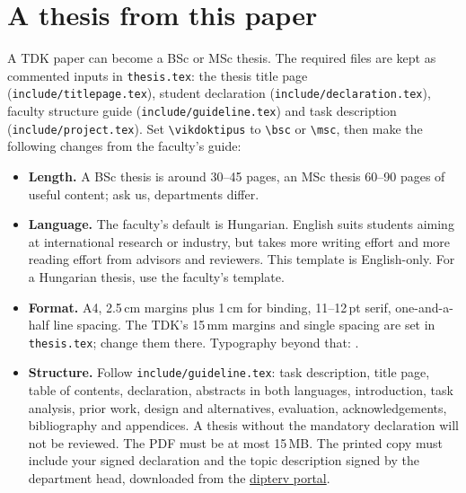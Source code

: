 \section{A thesis from this paper}\label{app:tdk:thesis}
A TDK paper can become a BSc or MSc thesis. The required files are kept as commented inputs in \texttt{thesis.tex}: the thesis title page (\texttt{include/titlepage.tex}), student declaration (\texttt{include/declaration.tex}), faculty structure guide (\texttt{include/guideline.tex}) and task description (\texttt{include/project.tex}). Set \texttt{\textbackslash vikdoktipus} to \texttt{\textbackslash bsc} or \texttt{\textbackslash msc}, then make the following changes from the faculty's guide:
\begin{itemize}[noitemsep]
  \item \textbf{Length.} A BSc thesis is around 30--45 pages, an MSc thesis 60--90 pages of useful content; ask us, departments differ.
  \item \textbf{Language.} The faculty's default is Hungarian. English suits students aiming at international research or industry, but takes more writing effort and more reading effort from advisors and reviewers. This template is English-only. For a Hungarian thesis, use the faculty's template.
  \item \textbf{Format.} A4, 2.5\,cm margins plus 1\,cm for binding, 11--12\,pt serif, one-and-a-half line spacing. The TDK's 15\,mm margins and single spacing are set in \texttt{thesis.tex}; change them there. Typography beyond that: \citet{guide:Jeney}.
  \item \textbf{Structure.} Follow \texttt{include/guideline.tex}: task description, title page, table of contents, declaration, abstracts in both languages, introduction, task analysis, prior work, design and alternatives, evaluation, acknowledgements, bibliography and appendices. A thesis without the mandatory declaration will not be reviewed. The PDF must be at most 15\,MB. The printed copy must include your signed declaration and the topic description signed by the department head, downloaded from the \href{https://diplomaterv.vik.bme.hu/}{dipterv portal}.
\end{itemize}
